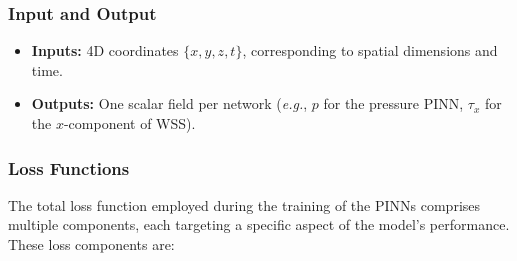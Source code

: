 \documentclass[12pt, a4paper]{article}
\begin{document}
\subsubsection{Input and Output}

\begin{itemize}
    \item \textbf{Inputs:} 4D coordinates $\{x, y, z, t\}$, corresponding to spatial dimensions and time.
    \item \textbf{Outputs:} One scalar field per network (\emph{e.g.}, $p$ for the pressure PINN, $\tau_x$ for the $x$-component of WSS).
\end{itemize}

\subsubsection{Loss Functions}
\label{sec:Loss_Functions}

The total loss function employed during the training of the PINNs comprises multiple components, each targeting a specific aspect of the model's performance. These loss components are:
\end{document}
